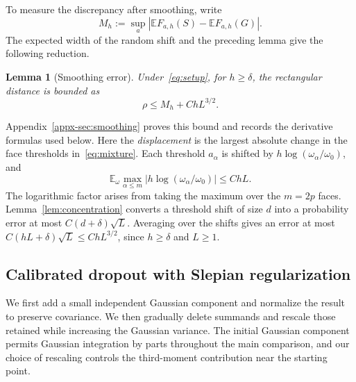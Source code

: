 \documentclass[11pt,letterpaper]{article}
\newtheorem{lemma}{Lemma}
\theoremstyle{remark}
\newcommand{\E}{\mathbb E}
\begin{document}
To measure the discrepancy after smoothing, write
\[
 M_h:=\sup_a|\E F_{a,h}(S)-\E F_{a,h}(G)|.
\]
The expected width of the random shift and the preceding lemma give
the following reduction.
\begin{lemma}[Smoothing error]\label{lem:endpoint}
Under~\eqref{eq:setup}, for \(h\ge\delta\), the rectangular distance is bounded as
\begin{equation}
 \rho\le M_h+ChL^{3/2}.
 \label{eq:endpoint-min}
\end{equation}
\end{lemma}
Appendix~\ref{appx-sec:smoothing} proves this bound and records the
derivative formulas used below. Here the \emph{displacement} is the
largest absolute change in the face thresholds in~\eqref{eq:mixture}.
Each threshold \(a_\alpha\) is shifted by
\(h\log(\omega_\alpha/\omega_0)\), and
\[
 \E_\omega\max_{\alpha\le m}
 \bigl|h\log(\omega_\alpha/\omega_0)\bigr|\le ChL.
\]
The logarithmic factor arises from taking the maximum over the
\(m=2p\) faces. Lemma~\ref{lem:concentration} converts a threshold
shift of size \(d\) into a probability error at most
\(C(d+\delta)\sqrt L\). Averaging over the shifts gives an error
at most \(C(hL+\delta)\sqrt L\le ChL^{3/2}\), since
\(h\ge\delta\) and \(L\ge1\).


\subsection{Calibrated dropout with Slepian regularization}
\label{sec:outline-path}

We first add a small independent Gaussian component and normalize
the result to preserve covariance. We then gradually delete summands
and rescale those retained while increasing the Gaussian variance.
The initial Gaussian component permits Gaussian integration by parts
throughout the main comparison, and our choice of rescaling controls
the third-moment contribution near the starting point.
\end{document}
